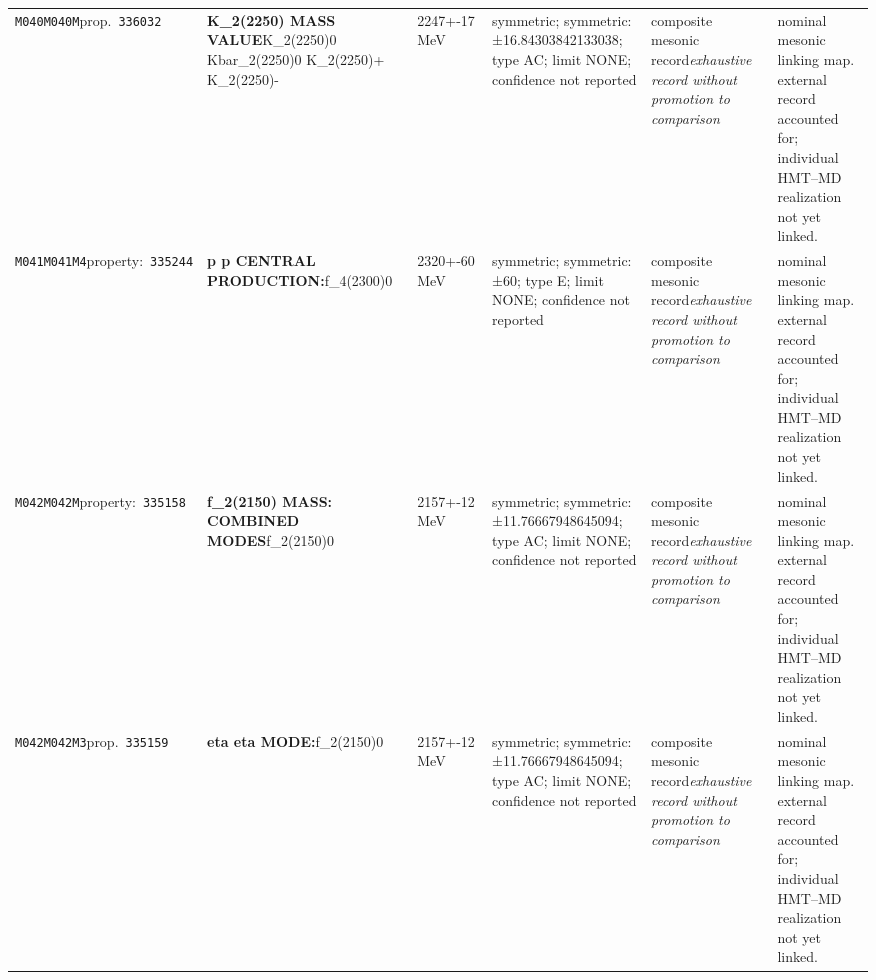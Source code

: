 \begin{landscape}
\begin{longtable}{L{1.85cm}L{4.45cm}L{2.35cm}L{4.05cm}L{3.35cm}L{7.15cm}}
\texttt{M040}\newline \texttt{M040M}\newline prop.\ \texttt{336032} & \textbf{K\_\allowbreak{}2(2250) MASS VALUE}\newline K\_\allowbreak{}2(2250)0 \textbar{}\allowbreak{} Kbar\_\allowbreak{}2(2250)0 \textbar{}\allowbreak{} K\_\allowbreak{}2(2250)+ \textbar{}\allowbreak{} K\_\allowbreak{}2(2250)- & 2247+-17\,MeV & symmetric; symmetric: ±16.84303842133038; type AC; limit NONE; confidence not reported & composite mesonic record\newline \emph{exhaustive record without promotion to comparison} & nominal mesonic linking map. external record accounted for; individual HMT--MD realization not yet linked. \\
\texttt{M041}\newline \texttt{M041M4}\newline property:\ \texttt{335244} & \textbf{p p CENTRAL PRODUCTION:}\newline f\_\allowbreak{}4(2300)0 & 2320+-60\,MeV & symmetric; symmetric: ±60; type E; limit NONE; confidence not reported & composite mesonic record\newline \emph{exhaustive record without promotion to comparison} & nominal mesonic linking map. external record accounted for; individual HMT--MD realization not yet linked. \\
\texttt{M042}\newline \texttt{M042M}\newline property:\ \texttt{335158} & \textbf{f\_\allowbreak{}2(2150) MASS: COMBINED MODES}\newline f\_\allowbreak{}2(2150)0 & 2157+-12\,MeV & symmetric; symmetric: ±11.76667948645094; type AC; limit NONE; confidence not reported & composite mesonic record\newline \emph{exhaustive record without promotion to comparison} & nominal mesonic linking map. external record accounted for; individual HMT--MD realization not yet linked. \\
\texttt{M042}\newline \texttt{M042M3}\newline prop.\ \texttt{335159} & \textbf{eta eta MODE:}\newline f\_\allowbreak{}2(2150)0 & 2157+-12\,MeV & symmetric; symmetric: ±11.76667948645094; type AC; limit NONE; confidence not reported & composite mesonic record\newline \emph{exhaustive record without promotion to comparison} & nominal mesonic linking map. external record accounted for; individual HMT--MD realization not yet linked. \\

\end{longtable}
\end{landscape}
